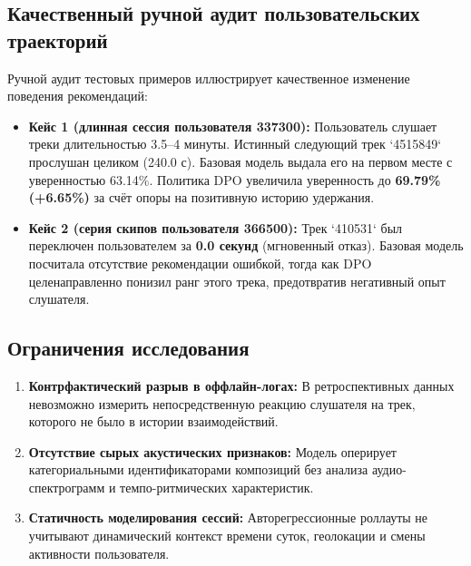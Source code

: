 \subsection{Качественный ручной аудит пользовательских траекторий}
Ручной аудит тестовых примеров иллюстрирует качественное изменение поведения рекомендаций:
\begin{itemize}
    \item \textbf{Кейс 1 (длинная сессия пользователя 337300):} Пользователь слушает треки длительностью 3.5--4 минуты. Истинный следующий трек `4515849` прослушан целиком (240.0 с). Базовая модель выдала его на первом месте с уверенностью 63.14\%. Политика DPO увеличила уверенность до \textbf{69.79\% (+6.65\%)} за счёт опоры на позитивную историю удержания.
    \item \textbf{Кейс 2 (серия скипов пользователя 366500):} Трек `410531` был переключен пользователем за \textbf{0.0 секунд} (мгновенный отказ). Базовая модель посчитала отсутствие рекомендации ошибкой, тогда как DPO целенаправленно понизил ранг этого трека, предотвратив негативный опыт слушателя.
\end{itemize}

\subsection{Ограничения исследования}
\begin{enumerate}
    \item \textbf{Контрфактический разрыв в оффлайн-логах:} В ретроспективных данных невозможно измерить непосредственную реакцию слушателя на трек, которого не было в истории взаимодействий.
    \item \textbf{Отсутствие сырых акустических признаков:} Модель оперирует категориальными идентификаторами композиций без анализа аудио-спектрограмм и темпо-ритмических характеристик.
    \item \textbf{Статичность моделирования сессий:} Авторегрессионные роллауты не учитывают динамический контекст времени суток, геолокации и смены активности пользователя.
\end{enumerate}

